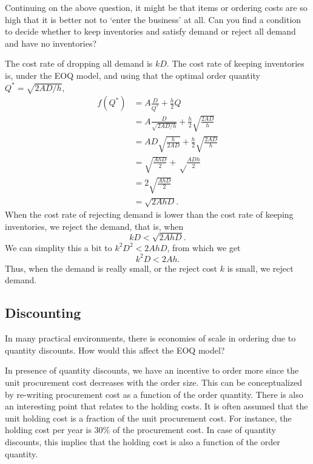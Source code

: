 \begin{exercise}[\faRocket]
  Continuing on the above question, it might be that items or ordering
  costs are so high that it is better not to `enter the business' at
  all. Can you find a condition to decide whether to keep inventories
  and satisfy demand or reject all demand and have no inventories?
  \begin{solution}
    The cost rate of dropping all demand is $kD$. The cost rate of keeping inventories is, under the EOQ model,  and using that the optimal order quantity $Q^* = \sqrt{2AD/h}$, 
    \begin{align*}
      f(Q^*)
 &= A \frac{D}{Q^*} + \frac h 2 Q \\
 &= A \frac{D}{\sqrt{2AD/h}} + \frac h 2 \sqrt{\frac{2AD}h} \\
 &= A D \sqrt{\frac{h} {2AD}} + \frac h 2 \sqrt{\frac{2AD}h} \\
 &=  \sqrt{\frac {AhD}{2}} + \sqrt\frac{ADh}2 \\
 &=  2\sqrt{\frac {AhD}{2}} \\
 &=  \sqrt{2AhD}.
    \end{align*}
When the cost rate of rejecting demand is lower than the cost rate of keeping inventories, we reject the demand, that is, when
\begin{equation*}
kD < \sqrt{2AhD}.
\end{equation*}
We can simplity this a bit to $k^2D^2 < 2AhD$, from which we get
\begin{equation*}
  k^2 D < 2 A h.
\end{equation*}
Thus, when the demand is really small, or the reject cost $k$ is
small, we reject demand. 
  \end{solution}
\end{exercise}

\subsection{Discounting}
\label{sec:discounting}



\begin{exercise}
In many practical environments, there is economies of scale in ordering due to quantity discounts. How would this affect the EOQ model?


\begin{solution}
In presence of quantity discounts, we have an incentive to order more since the unit procurement cost decreases with the order size. This can be conceptualized by re-writing procurement cost as a function of the order quantity. There is also an interesting point that relates to the holding costs. It is often assumed that the unit holding cost is a fraction of the unit procurement cost. For instance, the holding cost per year is 30\% of the procurement cost. In case of quantity discounts, this implies that the holding cost is also a function of the order quantity. 
\end{solution}
\end{exercise}

